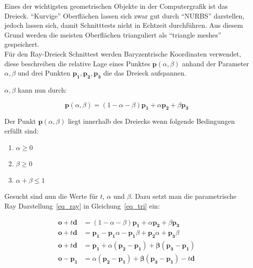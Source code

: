 Eines der wichtigsten geometrischen Objekte in der Computergrafik ist das Dreieck.
"`Kurvige"' Oberflächen lassen sich zwar gut durch "`NURBS"' darstellen,
jedoch lassen sich, damit Schnitttests nicht in Echtzeit durchführen. Aus diesem Grund
werden die meisten Oberflächen trianguliert als "`triangle meshes"' gespeichert.\\

Für den Ray-Dreieck Schnittest werden Baryzentrische Koordinaten verwendet, diese
beschreiben die relative Lage eines Punktes $\mathbf{p}(\mathit{\alpha, \beta})$ anhand 
der Parameter $\mathit{\alpha, \beta}$ und drei Punkten $\mathbf{p_1, p_2, p_3}$ die das
Dreieck aufspannen.

$\mathit{\alpha, \beta}$ kann nun durch: 

\begin{equation}
    \mathbf{p}(\mathit{\alpha, \beta}) = (1 - \alpha - \beta)\mathbf{p_1} + \alpha\mathbf{p_2} + \beta\mathbf{p_3}
    \label{eq_tri}
\end{equation}

Der Punkt $\mathbf{p}(\mathit{\alpha, \beta})$ liegt innerhalb des Dreiecks
wenn folgende Bedingungen erfüllt sind:


\begin{enumerate}
\centering
\item $\mathit{\alpha} \geq 0$
\item $\mathit{\beta} \geq 0$
\item $\mathit{\alpha} + \mathit{\beta} \leq 1$
\end{enumerate}

Gesucht sind nun die Werte für $\mathit{t}$, $\mathit{\alpha}$ und $\mathit{\beta}$.
Dazu setzt man die parametrische Ray Darstellung~\ref{eq_ray} in Gleichung~\ref{eq_tri} ein:

\begin{align*}
    \mathbf{o} + \mathit{t}\mathbf{d} &= (1 - \alpha - \beta)\mathbf{p_1} + \mathit{\alpha}\mathbf{p_2}
                                          + \mathit{\beta}\mathbf{p_3}\\
    \mathbf{o} + \mathit{t}\mathbf{d} &= \mathbf{p_1} - \mathbf{p_1}\mathit{\alpha} - 
    \mathbf{p_1}\mathit{\beta} + \mathbf{p_2}\mathit{\alpha} + \mathbf{p_3}\mathit{\beta}\\
    \mathbf{o} + \mathit{t}\mathbf{d} &= \mathbf{p_1} + \mathit{\alpha}(\mathbf{p_2 - p_1})
    + \mathbf{\beta}(\mathbf{p_3 - p_1})\\
    \mathbf{o - p_1} &= \mathit{\alpha}(\mathbf{p_2 - p_1}) + \mathbf{\beta}(\mathbf{p_3 - p_1})
    - \mathit{t}\mathbf{d}
\end{align*}


